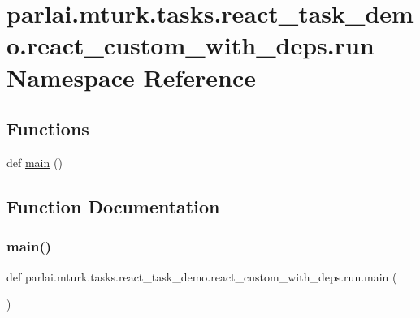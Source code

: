 \hypertarget{namespaceparlai_1_1mturk_1_1tasks_1_1react__task__demo_1_1react__custom__with__deps_1_1run}{}\section{parlai.\+mturk.\+tasks.\+react\+\_\+task\+\_\+demo.\+react\+\_\+custom\+\_\+with\+\_\+deps.\+run Namespace Reference}
\label{namespaceparlai_1_1mturk_1_1tasks_1_1react__task__demo_1_1react__custom__with__deps_1_1run}
\subsection*{Functions}
\begin{DoxyCompactItemize}
\item 
def \hyperlink{namespaceparlai_1_1mturk_1_1tasks_1_1react__task__demo_1_1react__custom__with__deps_1_1run_a50f23070329d468b1499c88037338007}{main} ()
\end{DoxyCompactItemize}


\subsection{Function Documentation}
\mbox{\label{namespaceparlai_1_1mturk_1_1tasks_1_1react__task__demo_1_1react__custom__with__deps_1_1run_a50f23070329d468b1499c88037338007}} 
\subsubsection{\texorpdfstring{main()}{main()}}
{\footnotesize\ttfamily def parlai.\+mturk.\+tasks.\+react\+\_\+task\+\_\+demo.\+react\+\_\+custom\+\_\+with\+\_\+deps.\+run.\+main (\begin{DoxyParamCaption}{ }\end{DoxyParamCaption})}

